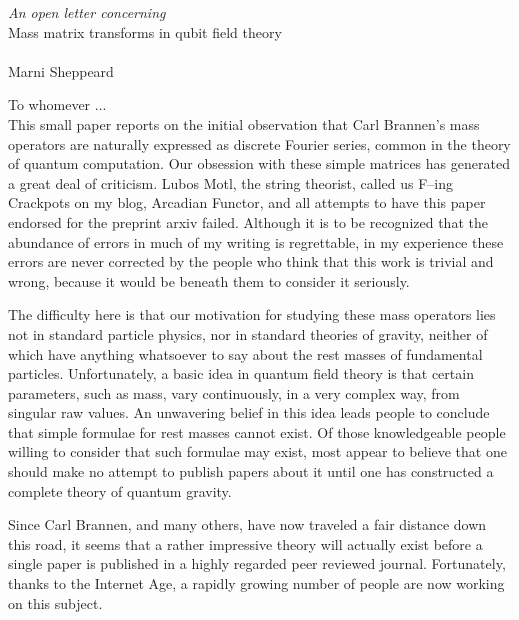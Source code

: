 \documentclass[11pt]{article}
\begin{document}
%
%

\begin{center}
\Large{\textit{An open letter concerning}}\\
\LARGE{Mass matrix transforms in qubit field theory}\\
\hfill\\
\large{Marni Sheppeard}
\end{center}

To whomever ...
\hfill\\

This small paper reports on the initial observation that Carl Brannen's mass operators are naturally expressed as discrete Fourier series, common in the theory of quantum computation. Our obsession with these simple matrices has generated a great deal of criticism. Lubos Motl, the string theorist, called us F--ing Crackpots on my blog, Arcadian Functor, and all attempts to have this paper endorsed for the preprint arxiv failed. Although it is to be recognized that the abundance of errors in much of my writing is regrettable, in my experience these errors are never corrected by the people who think that this work is trivial and wrong, because it would be beneath them to consider it seriously.

The difficulty here is that our motivation for studying these mass operators lies not in standard particle physics, nor in standard theories of gravity, neither of which have anything whatsoever to say about the rest masses of fundamental particles. Unfortunately, a basic idea in quantum field theory is that certain parameters, such as mass, vary continuously, in a very complex way, from singular raw values. An unwavering belief in this idea leads people to conclude that simple formulae for rest masses cannot exist. Of those knowledgeable people willing to consider that such formulae may exist, most appear to believe that one should make no attempt to publish papers about it until one has constructed a complete theory of quantum gravity. 

Since Carl Brannen, and many others, have now traveled a fair distance down this road, it seems that a rather impressive theory will actually exist before a single paper is published in a highly regarded peer reviewed journal. Fortunately, thanks to the Internet Age, a rapidly growing number of people are now working on this subject.
\end{document}
